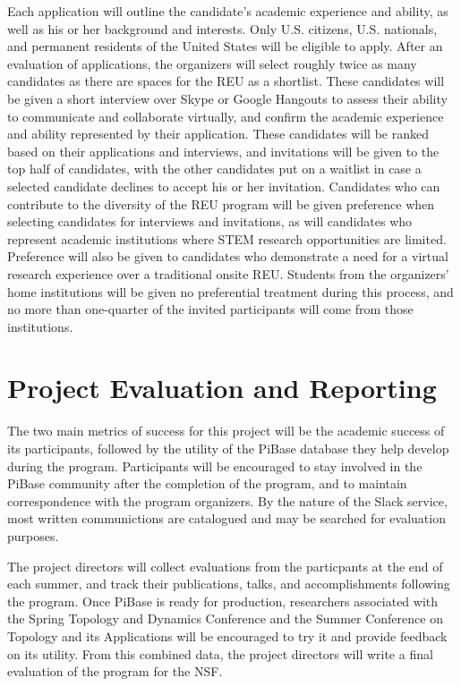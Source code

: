   Each application will outline the candidate's academic
  experience and ability, as well as his or her background and interests.
  Only U.S. citizens, U.S. nationals, and
  permanent residents of the United States will be eligible to apply.
  After an evaluation of applications, the organizers will select roughly twice
  as many candidates as there are spaces for the REU as a shortlist. These
  candidates will be given a short interview over Skype or Google Hangouts
  to assess their ability to communicate and collaborate virtually,
  and confirm the academic experience
  and ability represented by their application. These candidates will be
  ranked based on their applications and interviews, and invitations will
  be given to the top half of candidates, with the other candidates put
  on a waitlist in case a selected candidate declines to accept his or her
  invitation. Candidates who can contribute to the diversity of the
  REU program will be given preference when selecting candidates for
  interviews and invitations, as will candidates who represent academic
  institutions where STEM research opportunities are limited. Preference
  will also be given to candidates who demonstrate a need for a virtual
  research experience over a traditional onsite REU.
  Students from the organizers' home institutions
  will be given no preferential treatment during this process, and no more
  than one-quarter of the invited participants will come from those
  institutions.

\section{Project Evaluation and Reporting}

  The two main metrics of success for this project will be the academic success
  of its participants, followed by the utility of the PiBase database they help
  develop during the program. Participants will be encouraged to stay involved
  in the PiBase community after the completion of the program, and to maintain
  correspondence with the program organizers. By the nature of the Slack
  service, most written communictions are catalogued and may be searched for
  evaluation purposes.

  The project directors will collect evaluations from the particpants at the end
  of each summer, and track their publications, talks, and
  accomplishments following the program. Once PiBase is ready for production,
  researchers associated with the Spring Topology and Dynamics Conference
  and the Summer Conference on Topology and its Applications
  will be encouraged to try it and provide feedback on its utility. From this
  combined data, the project directors will write a final evaluation of the
  program for the NSF.

